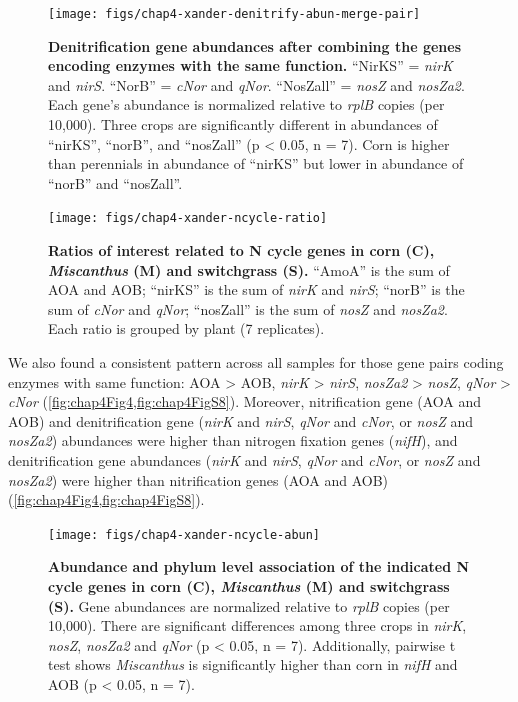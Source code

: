 \documentclass[]{msu-thesis}
\begin{document}
\begin{figure}[tbph!]
  \centering
  \texttt{[image: figs/chap4-xander-denitrify-abun-merge-pair]}
  \caption[Denitrification gene abundances after combining the genes
  encoding enzymes with the same function]{\textbf{Denitrification gene
  abundances after combining the genes encoding enzymes with the same
function.} ``NirKS'' = \textit{nirK} and \textit{nirS}. ``NorB'' =
\textit{cNor} and \textit{qNor}.  ``NosZall'' = \textit{nosZ} and
\textit{nosZa2}. Each gene's abundance is normalized relative to
\textit{rplB} copies (per 10,000). Three crops are significantly
different in abundances of ``nirKS'', ``norB'', and ``nosZall'' (p <
0.05, n = 7). Corn is higher than perennials in abundance of ``nirKS''
but lower in abundance of ``norB'' and ``nosZall''.}
  \label{fig:chap4Fig5}
\end{figure}


\begin{figure}[tbph!]
  \centering
  \texttt{[image: figs/chap4-xander-ncycle-ratio]}
  \caption[Ratios of interest related to N cycle genes in corn (C),
  \textit{Miscanthus} (M) and switchgrass (S)]{\textbf{Ratios of
    interest related to N cycle genes in corn (C), \textit{Miscanthus}
  (M) and switchgrass (S).} ``AmoA'' is the sum of AOA and AOB;
  ``nirKS'' is the sum of \textit{nirK} and \textit{nirS}; ``norB'' is
  the sum of \textit{cNor} and \textit{qNor}; ``nosZall'' is the sum of
  \textit{nosZ} and \textit{nosZa2}. Each ratio is grouped by plant (7
replicates).}
  \label{fig:chap4FigS8}
\end{figure}



We also found a consistent pattern across all samples for those gene
pairs coding enzymes with same function: AOA > AOB, \textit{nirK} >
\textit{nirS}, \textit{nosZa2} > \textit{nosZ}, \textit{qNor} >
\textit{cNor} (\cref{fig:chap4Fig4,fig:chap4FigS8}). Moreover,
nitrification gene (AOA and AOB) and denitrification gene (\textit{nirK} and \textit{nirS}, \textit{qNor} and \textit{cNor}, or
\textit{nosZ} and \textit{nosZa2}) abundances were higher than nitrogen
fixation genes (\textit{nifH}), and denitrification gene abundances
(\textit{nirK} and \textit{nirS}, \textit{qNor} and \textit{cNor}, or
\textit{nosZ} and \textit{nosZa2}) were higher than nitrification genes (AOA and AOB) (\cref{fig:chap4Fig4,fig:chap4FigS8}).


\begin{figure}[tbph!]
  \centering
  \texttt{[image: figs/chap4-xander-ncycle-abun]}
  \caption[Abundance and phylum level association of the indicated N
  cycle genes in corn (C), \textit{Miscanthus} (M) and switchgrass
(S)]{\textbf{Abundance and phylum level association of the indicated N
  cycle genes in corn (C), \textit{Miscanthus} (M) and switchgrass (S).}
  Gene abundances are normalized relative to \textit{rplB} copies (per
  10,000). There are significant differences among three crops in
  \textit{nirK}, \textit{nosZ}, \textit{nosZa2} and \textit{qNor} (p <
  0.05, n = 7). Additionally, pairwise t test shows \textit{Miscanthus}
  is significantly higher than corn in \textit{nifH} and AOB (p < 0.05,
n = 7).}
  \label{fig:chap4Fig4}
\end{figure}
\end{document}
